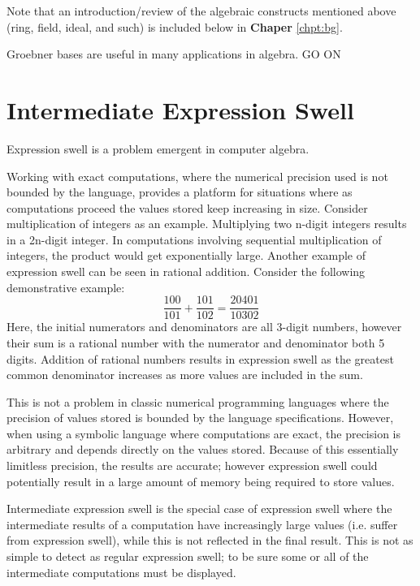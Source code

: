 \documentclass[letterpaper,12pt,titlepage,oneside,final]{book}
\begin{document}
Note that an introduction/review of the algebraic constructs mentioned above (ring, field, ideal, and such) is included below in \textbf{Chaper} \ref{chpt:bg}.    

Groebner bases are useful in many applications in algebra.  GO ON

\section{Intermediate Expression Swell}

Expression swell is a problem emergent in computer algebra.

Working with exact computations, where the numerical precision used is not bounded by the language, provides a platform for situations where as computations proceed the values stored keep increasing in size.  Consider multiplication of integers as an example.  Multiplying two n-digit integers results in a 2n-digit integer.  In computations involving sequential multiplication of integers, the product would get exponentially large.  Another example of expression swell can be seen in rational addition. Consider the following demonstrative example:
\begin{equation*}
  \frac{100}{101} + \frac{101}{102} = \frac{20401}{10302}
\end{equation*}
Here, the initial numerators and denominators are all 3-digit numbers, however their sum is a rational number with the numerator and denominator both 5 digits.  Addition of rational numbers results in expression swell as the greatest common denominator increases as more values are included in the sum.

This is not a problem in classic numerical programming languages where the precision of values stored is bounded by the language specifications.  However, when using a symbolic language where computations are exact, the precision is arbitrary and depends directly on the values stored.  Because of this essentially limitless precision, the results are accurate; however expression swell could potentially result in a large amount of memory being required to store values.

Intermediate expression swell is the special case of expression swell where the intermediate results of a computation have increasingly large values (i.e. suffer from expression swell), while this is not reflected in the final result.  This is not as simple to detect as regular expression swell; to be sure some or all of the intermediate computations must be displayed. 
\end{document}
